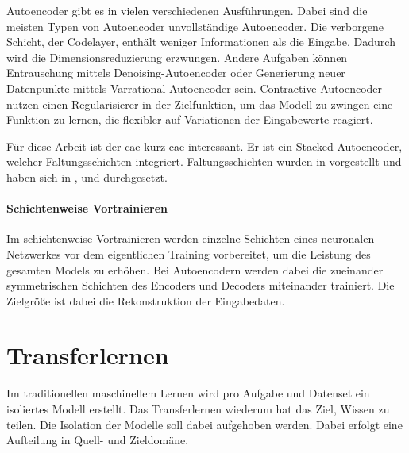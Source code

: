 	Autoencoder gibt es in vielen verschiedenen Ausführungen. Dabei sind die meisten Typen von Autoencoder unvollständige Autoencoder. Die verborgene Schicht, der Codelayer, enthält weniger Informationen als die Eingabe. Dadurch wird die Dimensionsreduzierung erzwungen. Andere Aufgaben können Entrauschung mittels Denoising-Autoencoder \cite{Vincent.2008} oder Generierung neuer Datenpunkte mittels Varrational-Autoencoder \cite{Kingma.2019} sein. Contractive-Autoencoder \cite{Rifai.2011} nutzen einen Regularisierer in der Zielfunktion, um das Modell zu zwingen eine Funktion zu lernen, die flexibler auf Variationen der Eingabewerte reagiert.   	

	Für diese Arbeit ist der \acl{cae} \cite{Masci.2011} kurz \ac{cae} interessant. Er ist ein Stacked-Autoencoder, welcher Faltungsschichten integriert. Faltungsschichten wurden in \cite{LeCun.1999} vorgestellt und haben sich in \cite{Krizhevsky.2012}, \cite{ChristianSzegedy.2014} und \cite{LeCun.2015} durchgesetzt. 
		
	\paragraph{Schichtenweise Vortrainieren} Im schichtenweise Vortrainieren \cite{Bengio.2007} werden einzelne Schichten eines neuronalen Netzwerkes vor dem eigentlichen Training vorbereitet, um die Leistung des gesamten Models zu erhöhen. Bei Autoencodern werden dabei die zueinander symmetrischen Schichten des Encoders und Decoders miteinander trainiert. Die Zielgröße ist dabei die Rekonstruktion der Eingabedaten.    

	\section{ Transferlernen}
	\label{sec:Transferlernen}
	Im traditionellen maschinellem Lernen wird pro Aufgabe und Datenset ein isoliertes Modell erstellt. Das Transferlernen wiederum hat das Ziel, Wissen zu teilen. Die Isolation der Modelle soll dabei aufgehoben werden. Dabei erfolgt eine Aufteilung in Quell- und Zieldomäne.
	
